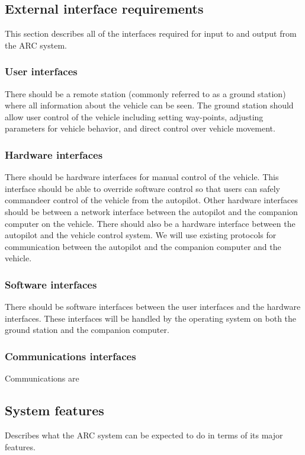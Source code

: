 \documentclass[compsoc,draftclsnofoot,onecolumn,10pt]{IEEEtran}
\begin{document}
\subsection{External interface requirements}
This section describes all of the interfaces required for input to and output
from the ARC system.
	\subsubsection{User interfaces}
	There should be a remote station (commonly referred to as a ground station) where all information about the vehicle can be seen.
	The ground station should allow user control of the vehicle including setting way-points, adjusting parameters for vehicle behavior, and direct control over vehicle movement.
	
	\subsubsection{Hardware interfaces}
	There should be hardware interfaces for manual control of the vehicle. 
	This interface should be able to override software control so that users can safely commandeer control of the vehicle from the autopilot. 
	Other hardware interfaces should be between a network interface between the autopilot and the companion computer on the vehicle.
	There should also be a hardware interface between the autopilot and the vehicle control system.
	We will use existing protocols for communication between the autopilot and the companion computer and the vehicle.

	\subsubsection{Software interfaces}
	There should be software interfaces between the user interfaces and the hardware interfaces. These interfaces will be handled by the operating system on both the ground station and the companion computer.

	\subsubsection{Communications interfaces}
	Communications are 

\subsection{System features}
Describes what the ARC system can be expected to do in terms of its major features.
\end{document}
